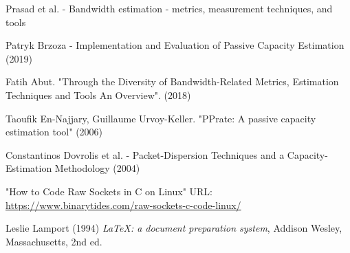 \begin{thebibliography}{9}
Prasad et al. - Bandwidth estimation - metrics, measurement techniques, and tools 

Patryk Brzoza - Implementation and Evaluation of Passive Capacity Estimation (2019)

Fatih Abut. "Through the Diversity of Bandwidth-Related Metrics, Estimation Techniques and Tools An Overview". (2018)

Taoufik En-Najjary, Guillaume Urvoy-Keller. "PPrate: A passive capacity estimation tool" (2006)

Constantinos Dovrolis et al. - Packet-Dispersion Techniques and a Capacity-Estimation Methodology (2004)

"How to Code Raw Sockets in C on Linux" URL: \url{https://www.binarytides.com/raw-sockets-c-code-linux/}

Leslie Lamport (1994) \emph{\LaTeX: a document preparation system}, Addison
Wesley, Massachusetts, 2nd ed.
\end{thebibliography}
